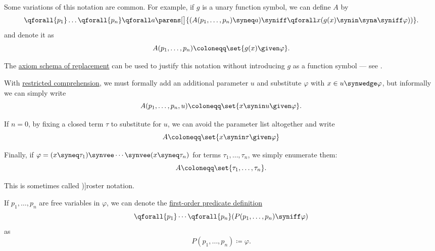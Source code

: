 \begin{definition}
  \begin{thmenum}
     Some variations of this notation are common. For example, if \( g \) is a unary function symbol, we can define \( A \) by
    \begin{equation*}
      \qforall {p_1} \ldots \qforall {p_n} \qforall a \parens[\big]{ (A(p_1, \ldots, p_n) \syneq a) \syniff \qforall x (g(x) \synin \syna \syniff \varphi)) }.
    \end{equation*}
    and denote it as
    \begin{equation*}
      A(p_1, \ldots, p_n) \coloneqq \set{ g(x) \given \varphi }.
    \end{equation*}

    The \hyperref[def:zfc/replacement]{axiom schema of replacement} can be used to justify this notation without introducing \( g \) as a function symbol --- see .

     With \hyperref[def:zfc/comprehension]{restricted comprehension}, we must formally add an additional parameter \( u \) and substitute \( \varphi \) with \( x \in u \synwedge \varphi  \), but informally we can simply write
    \begin{equation*}
      A(p_1, \ldots, p_n, u) \coloneqq \set{ x \synin u \given \varphi }.
    \end{equation*}

    If \( n = 0 \), by fixing a closed term \( \tau \) to substitute for \( u \), we can avoid the parameter list altogether and write
    \begin{equation*}
      A \coloneqq \set{ x \synin \tau \given \varphi }
    \end{equation*}

     Finally, if \( \varphi = (x \syneq \tau_1) \synvee \cdots \synvee (x \syneq \tau_n) \) for terms \( \tau_1, \ldots, \tau_n \), we simply enumerate them:
    \begin{equation*}
      A \coloneqq \set{ \tau_1, \ldots, \tau_n }.
    \end{equation*}

    This is sometimes called \term[en=roster notation (\cite[10]{CitkinMuravitsky2022ConsequenceRelations})]{roster notation}.

     If \( p_1, \ldots, p_n \) are free variables in \( \varphi \), we can denote the \hyperref[def:fol_definition/predicate]{first-order predicate definition}
    \begin{equation*}
      \qforall {p_1} \cdots \qforall {p_n} (P(p_1, \ldots, p_n) \syniff \varphi)
    \end{equation*}
    as
    \begin{equation*}
      P(p_1, \ldots, p_n) \coloneqq \varphi.
    \end{equation*}
  \end{thmenum}
\end{definition}
